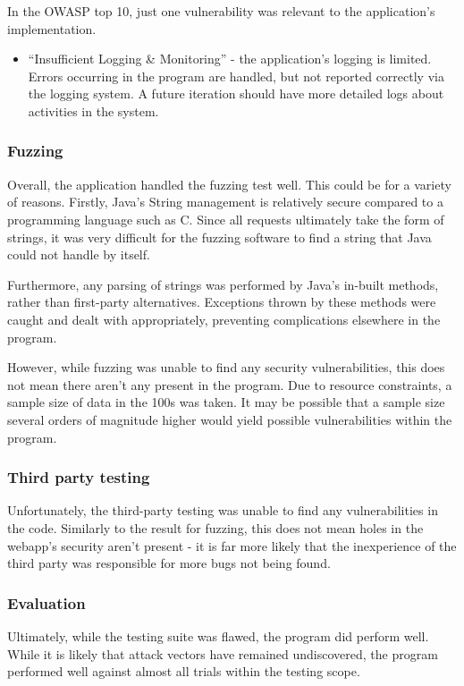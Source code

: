 In the OWASP top 10, just one vulnerability was relevant to the application's implementation.

\begin{itemize}

    \item ``Insufficient Logging \& Monitoring'' - the application's logging is limited. Errors occurring in the program are handled, but not reported correctly via the logging system. A future iteration should have more detailed logs about activities in the system.

\end{itemize}

\subsubsection{Fuzzing}

Overall, the application handled the fuzzing test well. This could be for a variety of reasons. Firstly, Java's String management is relatively secure compared to a programming language such as C. Since all requests ultimately take the form of strings, it was very difficult for the fuzzing software to find a string that Java could not handle by itself.

Furthermore, any parsing of strings was performed by Java's in-built methods, rather than first-party alternatives. Exceptions thrown by these methods were caught and dealt with appropriately, preventing complications elsewhere in the program.

However, while fuzzing was unable to find any security vulnerabilities, this does not mean there aren't any present in the program. Due to resource constraints, a sample size of data in the 100s was taken. It may be possible that a sample size several orders of magnitude higher would yield possible vulnerabilities within the program. 

\subsubsection{Third party testing}

Unfortunately, the third-party testing was unable to find any vulnerabilities in the code. Similarly to the result for fuzzing, this does not mean holes in the webapp's security aren't present - it is far more likely that the inexperience of the third party was responsible for more bugs not being found.

\subsubsection{Evaluation}

Ultimately, while the testing suite was flawed, the program did perform well. While it is likely that attack vectors have remained undiscovered, the program performed well against almost all trials within the testing scope.